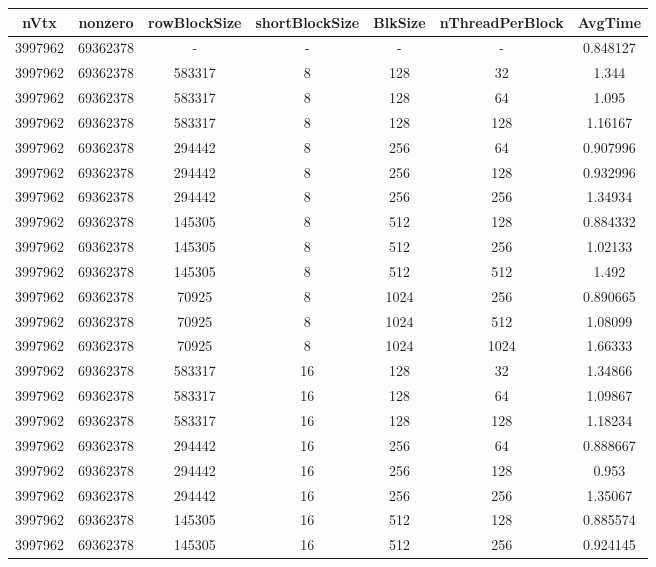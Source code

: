 \documentclass[9pt]{article}
\begin{document}
\SetBgPosition{0.25cm,-5.0cm}
\begin{tabular}{|c|c|c|c|c|c|c| }  
\hline
nVtx  & nonzero  & rowBlockSize  & shortBlockSize  & BlkSize  & nThreadPerBlock  & AvgTime \\
\hline
3997962  & 69362378  &  -  & -  & -  & -  &0.848127 \\
\hline
3997962  & 69362378  & 583317  & 8  & 128  & 32  & 1.344 \\
\hline
3997962  & 69362378  & 583317  & 8  & 128  & 64  & 1.095 \\
\hline
3997962  & 69362378  & 583317  & 8  & 128  & 128  & 1.16167 \\
\hline
3997962  & 69362378  & 294442  & 8  & 256  & 64  & 0.907996 \\
\hline
3997962  & 69362378  & 294442  & 8  & 256  & 128  & 0.932996 \\
\hline
3997962  & 69362378  & 294442  & 8  & 256  & 256  & 1.34934 \\
\hline
3997962  & 69362378  & 145305  & 8  & 512  & 128  & 0.884332 \\
\hline
3997962  & 69362378  & 145305  & 8  & 512  & 256  & 1.02133 \\
\hline
3997962  & 69362378  & 145305  & 8  & 512  & 512  & 1.492 \\
\hline
3997962  & 69362378  & 70925  & 8  & 1024  & 256  & 0.890665 \\
\hline
3997962  & 69362378  & 70925  & 8  & 1024  & 512  & 1.08099 \\
\hline
3997962  & 69362378  & 70925  & 8  & 1024  & 1024  & 1.66333 \\
\hline
3997962  & 69362378  & 583317  & 16  & 128  & 32  & 1.34866 \\
\hline
3997962  & 69362378  & 583317  & 16  & 128  & 64  & 1.09867 \\
\hline
3997962  & 69362378  & 583317  & 16  & 128  & 128  & 1.18234 \\
\hline
3997962  & 69362378  & 294442  & 16  & 256  & 64  & 0.888667 \\
\hline
3997962  & 69362378  & 294442  & 16  & 256  & 128  & 0.953 \\
\hline
3997962  & 69362378  & 294442  & 16  & 256  & 256  & 1.35067 \\
\hline
3997962  & 69362378  & 145305  & 16  & 512  & 128  & 0.885574 \\
\hline
3997962  & 69362378  & 145305  & 16  & 512  & 256  & 0.924145 \\

\end{tabular}
\end{document}
